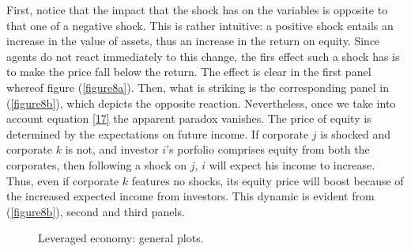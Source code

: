 \documentclass[11pt]{article}
\begin{document}
First, notice that the impact that the shock has on the variables is opposite to that one of a negative shock. This is rather intuitive: a positive shock entails an increase in the value of assets, thus an increase in the return on equity. Since agents do not react immediately to this change, the firs effect such a shock has is to make the price fall below the return. The effect is clear in the first panel whereof figure (\ref{figure8a}). Then, what is striking is the corresponding panel in (\ref{figure8b}), which depicts the opposite reaction. Nevertheless, once we take into account equation \eqref{17} the apparent paradox vanishes. The price of equity is determined by the expectations on future income. If corporate $j$ is shocked and corporate $k$ is not, and investor $i$'s porfolio comprises equity from both the corporates, then following a shock on $j$, $i$ will expect his income to increase. Thus, even if corporate $k$ features no shocks, its equity price will boost because of the increased expected income from investors. This dynamic is evident from (\ref{figure8b}), second and third panels.
\begin{figure}[h!]
\centering
{}\quad
{}
 \caption{Leveraged economy: general plots.} \label{figure9}
\end{figure}\\\\
\end{document}
